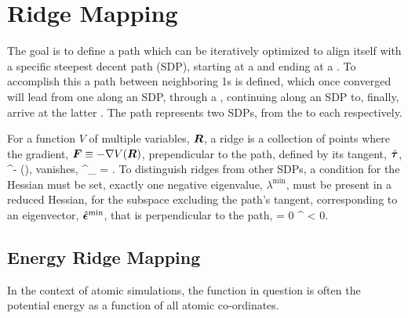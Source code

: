 \section{Ridge Mapping}
The goal is to define a path which can be iteratively optimized to align itself with a specific steepest decent path (SDP),
starting at a  and ending at a .
To accomplish this a path between neighboring \sap1s is defined,
which once converged will lead from one  along an SDP,
through a ,
continuing along an SDP to, finally, arrive at the latter .
The path represents two SDPs, from the  to each  respectively.

For a function $V$ of multiple variables, ${\bm{R}}$, a ridge is a collection of points where the gradient, ${\bm{F}} \equiv -\nabla V({\bm{R}})$, prependicular to the path, defined by its tangent, $\hat{{\bm{\tau}}}$,
\beq
\vF^\perp \equiv \vF - (\vF \cdot \uvt)\uvt,
\eeq
vanishes,
\beq
\vF^\perp_ = .
\eeq
To distinguish ridges from other SDPs,
a condition for the Hessian must be set,
exactly one negative eigenvalue, $\lambda^\text{min}$, must be present in a reduced Hessian, for the subspace excluding the path's tangent,
corresponding to an eigenvector, $\hat{{\bm{\epsilon}}}^\text{min}$, that is perpendicular to the path,
\beq
\uvm \cdot \uvt = 0 \quad {} \quad \lambda^ < 0.
\eeq




\incomplete

\subsection{Energy Ridge Mapping}
In the context of atomic simulations, the function in question is often the potential energy as a function of all atomic co-ordinates.

\incomplete

